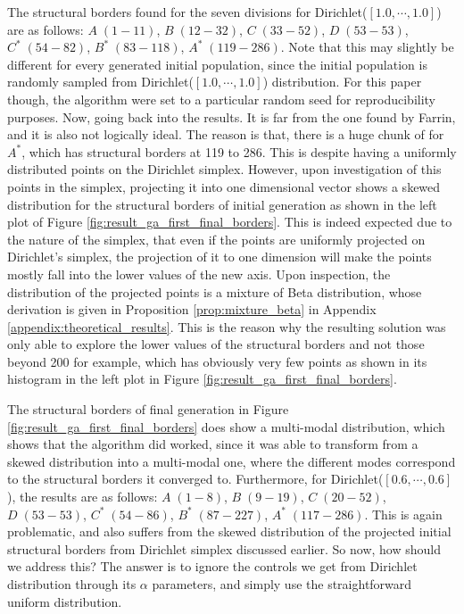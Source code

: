 The structural borders found for the seven divisions for Dirichlet($[1.0,\cdots,1.0]$) are as follows: $A\;(1-11)$, $B\;(12-32)$, $C\;(33-52)$, $D\;(53-53)$, $C^*\;(54-82)$, $B^*\;(83-118)$, $A^*\;(119-286)$. Note that this may slightly be different for every generated initial population, since the initial population is randomly sampled from Dirichlet($[1.0,\cdots,1.0]$) distribution. For this paper though, the algorithm were set to a particular random seed for reproducibility purposes. Now, going back into the results. It is far from the one found by Farrin, and it is also not logically ideal. The reason is that, there is a huge chunk of   for $A^*$, which has structural borders at 119 to 286. This is despite having a uniformly distributed points on the Dirichlet simplex. However, upon investigation of this points in the simplex, projecting it into one dimensional vector shows a skewed distribution for the structural borders of initial generation as shown in the left plot of Figure \ref{fig:result_ga_first_final_borders}. This is indeed expected due to the nature of the simplex, that even if the points are uniformly projected on Dirichlet's simplex, the projection of it to one dimension will make the points mostly fall into the lower values of the new axis. Upon inspection, the distribution of the projected points is a  mixture of Beta distribution, whose derivation is given in Proposition \ref{prop:mixture_beta} in Appendix \ref{appendix:theoretical_results}. This is the reason why the resulting solution was only able to explore the lower values of the structural borders and not those beyond 200 for example, which has obviously very few points as shown in its histogram in the left plot in Figure \ref{fig:result_ga_first_final_borders}.

The structural borders of final generation in Figure \ref{fig:result_ga_first_final_borders} does show a multi-modal distribution, which shows that the algorithm did worked, since it was able to transform from a skewed distribution into a multi-modal one, where the different modes correspond to the structural borders it converged to. Furthermore, for Dirichlet($[0.6,\cdots,0.6]$), the results are as follows: $A\;(1-8)$, $B\;(9-19)$, $C\;(20-52)$, $D\;(53-53)$, $C^*\;(54-86)$, $B^*\;(87-227)$, $A^*\;(117-286)$. This is again problematic, and also suffers from the skewed distribution of the projected initial structural borders from Dirichlet simplex discussed earlier. So now, how should we address this? The answer is to ignore the controls we get from Dirichlet distribution through its $\alpha$ parameters, and simply use the straightforward uniform distribution.

